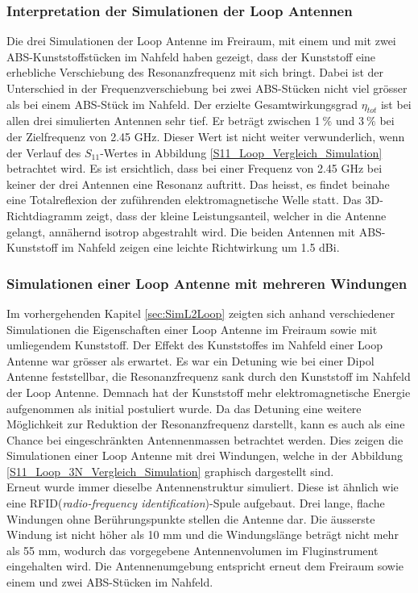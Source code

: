 \subsubsection{Interpretation der Simulationen der Loop Antennen}
Die drei Simulationen der Loop Antenne im Freiraum, mit einem und mit zwei ABS-Kunststoffstücken im Nahfeld haben gezeigt, dass der Kunststoff eine erhebliche Verschiebung des Resonanzfrequenz mit sich bringt. Dabei ist der Unterschied in der Frequenzverschiebung bei zwei ABS-Stücken nicht viel grösser als bei einem ABS-Stück im Nahfeld. Der erzielte Gesamtwirkungsgrad $\eta_{tot}$ ist bei allen drei simulierten Antennen sehr tief. Er beträgt zwischen 1$\ \%$ und 3$\ \%$ bei der Zielfrequenz von 2.45 GHz.
Dieser Wert ist nicht weiter verwunderlich, wenn der Verlauf des $S_{11}$-Wertes in Abbildung \ref{S11_Loop_Vergleich_Simulation} betrachtet wird. Es ist ersichtlich, dass bei einer Frequenz von 2.45 GHz bei keiner der drei Antennen eine Resonanz auftritt. Das heisst, es findet beinahe eine Totalreflexion der zuführenden elektromagnetische Welle statt. Das 3D-Richtdiagramm zeigt, dass der kleine Leistungsanteil, welcher in die Antenne gelangt, annähernd isotrop abgestrahlt wird. Die beiden Antennen mit ABS-Kunststoff im Nahfeld zeigen eine leichte Richtwirkung um 1.5 dBi.


\newpage
\subsubsection{Simulationen einer Loop Antenne mit mehreren Windungen}
Im vorhergehenden Kapitel \ref{sec:SimL2Loop} zeigten sich anhand verschiedener Simulationen die Eigenschaften einer Loop Antenne im Freiraum sowie mit umliegendem Kunststoff. Der Effekt des Kunststoffes im Nahfeld einer Loop Antenne war grösser als erwartet. Es war ein Detuning wie bei einer Dipol Antenne feststellbar, die Resonanzfrequenz sank durch den Kunststoff im Nahfeld der Loop Antenne. Demnach hat der Kunststoff mehr elektromagnetische Energie aufgenommen als initial postuliert wurde. Da das Detuning eine weitere Möglichkeit zur Reduktion der Resonanzfrequenz darstellt, kann es auch als eine Chance bei eingeschränkten Antennenmassen betrachtet werden. Dies zeigen die Simulationen einer Loop Antenne mit drei Windungen, welche in der Abbildung \ref{S11_Loop_3N_Vergleich_Simulation} graphisch dargestellt sind. \\
Erneut wurde immer dieselbe Antennenstruktur simuliert. Diese ist ähnlich wie eine RFID(\textit{radio-frequency identification})-Spule aufgebaut. Drei lange, flache Windungen ohne Berührungspunkte stellen die Antenne dar. Die äusserste Windung ist nicht höher als 10 mm und die Windungslänge beträgt nicht mehr als 55 mm, wodurch das vorgegebene Antennenvolumen im Fluginstrument eingehalten wird. Die Antennenumgebung entspricht erneut dem Freiraum sowie einem und zwei ABS-Stücken im Nahfeld.\\

